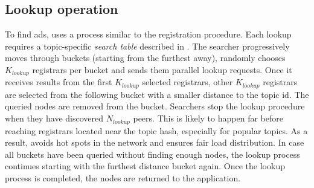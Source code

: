 
\subsection{Lookup operation}
\label{sec:lookup}


To find ads, \sysname uses a process similar to the registration procedure. 
Each lookup requires a topic-specific \emph{search table} described in .
The searcher progressively moves through buckets (starting from the furthest away), randomly chooses $K_\textit{lookup}$ registrars per bucket and sends them parallel lookup requests. 
Once it receives results from the first $K_\textit{lookup}$ selected registrars, other $K_\textit{lookup}$ registrars are selected from the following bucket with a smaller distance to the topic id.
The queried nodes are removed from the bucket.
Searchers stop the lookup procedure when they have discovered $N_\textit{lookup}$ peers. This is likely to happen far before reaching registrars located near the topic hash, especially for popular topics. As a result, \sysname avoids hot spots in the network and ensures fair load distribution. 
In case all buckets have been queried without finding enough nodes, the lookup process continues starting with the furthest distance bucket again. 
Once the lookup process is completed, the nodes are returned to the application.

